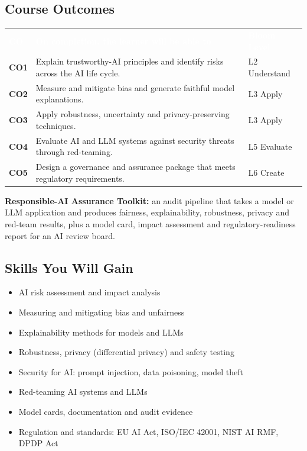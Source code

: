 \documentclass[10pt,a4paper]{article}
\newcommand{\hdr}{\rowcolor{navy}}
\newcommand{\hw}[1]{\textcolor{white}{\bfseries #1}}
\begin{document}
\subsection*{Course Outcomes}
\par{\small\begin{tabularx}{\linewidth}{@{}>{\bfseries}p{0.9cm}Y>{\raggedright\arraybackslash}p{2.3cm}@{}}\hdr\hw{CO}&\hw{On completion, the learner will be able to}&\hw{Bloom Level}\\
CO1 & Explain trustworthy-AI principles and identify risks across the AI life cycle. & L2 Understand\\
CO2 & Measure and mitigate bias and generate faithful model explanations. & L3 Apply\\
CO3 & Apply robustness, uncertainty and privacy-preserving techniques. & L3 Apply\\
CO4 & Evaluate AI and LLM systems against security threats through red-teaming. & L5 Evaluate\\
CO5 & Design a governance and assurance package that meets regulatory requirements. & L6 Create\\
\bottomrule\end{tabularx}}
\begin{tcolorbox}[colback=goldbg,colframe=goldl,boxrule=0.7pt,arc=2pt,title={Enterprise Capstone Product},colbacktitle=goldl!35,coltitle=navy,fonttitle=\small\bfseries]\small\textbf{Responsible-AI Assurance Toolkit:} an audit pipeline that takes a model or LLM application and produces fairness, explainability, robustness, privacy and red-team results, plus a model card, impact assessment and regulatory-readiness report for an AI review board.\end{tcolorbox}
\subsection*{Skills You Will Gain}\begin{multicols}{2}\begin{itemize}\small
\item AI risk assessment and impact analysis
\item Measuring and mitigating bias and unfairness
\item Explainability methods for models and LLMs
\item Robustness, privacy (differential privacy) and safety testing
\item Security for AI: prompt injection, data poisoning, model theft
\item Red-teaming AI systems and LLMs
\item Model cards, documentation and audit evidence
\item Regulation and standards: EU AI Act, ISO/IEC 42001, NIST AI RMF, DPDP Act
\end{itemize}\end{multicols}
\end{document}
